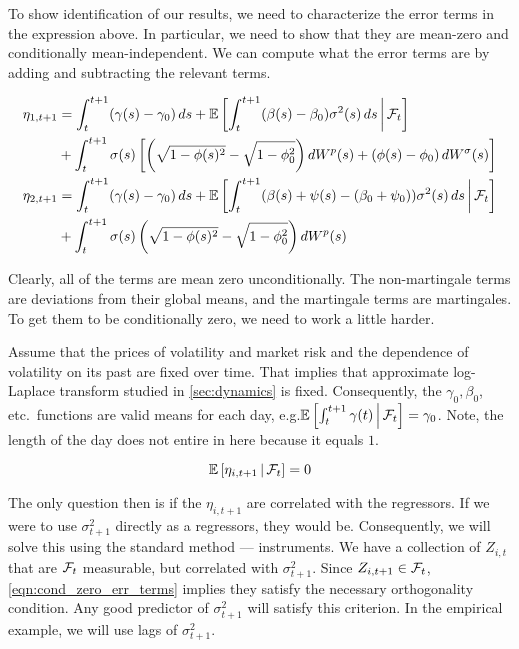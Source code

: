 \documentclass[11pt, letterpaper, twoside, final]{article}
\begin{document}
To show identification of our results, we need to characterize the error terms in the expression above.
In particular, we need to show that they are mean-zero and conditionally mean-independent.
We can compute what the error terms are by adding and subtracting the relevant terms.

\begin{alignat}{1}
    \eta_{1,t+1} 
    &= \int_t^{t+1}(\gamma(s) - \gamma_0) \dif s + \E\left[\int_t^{t+1} (\beta(s) - \beta_0) \sigma^2(s) \dif s
        \mvert \F_t\right] \\
    &+ \int_t^{t+1} \sigma(s) \left[\left(\sqrt{1 - \phi(s)^2} - \sqrt{1 - \phi_0^2}\right) \dif W^{p}(s) +
        \left(\phi(s) - \phi_0\right) \dif W^{\sigma}(s)\right] \nonumber \\
%
    \eta_{2,t+1} 
    &= \int_t^{t+1}(\gamma(s) - \gamma_0) \dif s + \E\left[\int_t^{t+1} (\beta(s) + \psi(s) - (\beta_0 + \psi_0))
       \sigma^2(s) \dif s \mvert \F_t\right] \\
    &+ \int_t^{t+1} \sigma(s) \left(\sqrt{1 - \phi(s)^2} - \sqrt{1 - \phi_0^2}\right) \dif W^{p}(s) \nonumber 
\end{alignat}

Clearly, all of the terms are mean zero unconditionally. 
The non-martingale terms are deviations from their global means, and the martingale terms are martingales.
To get them to be conditionally zero, we need to work a little harder.

Assume that the prices of volatility and market risk and the dependence of volatility on its past are fixed over
time.
That implies that approximate log-Laplace transform studied in \cref{sec:dynamics} is fixed.
Consequently, the $\gamma_0, \beta_0$, etc.\ functions are valid means for each day, e.g.\@ $\operatorname{\mathbb{E}}\left[\int_t^{t+1}
\gamma(t) \,\middle\vert\, \mathcal{F}_t \right] = \gamma_0$. 
Note, the length of the day does not entire in here because it equals $1$.

\begin{equation}
    \label{eqn:cond_zero_err_terms}
    \operatorname{\mathbb{E}}\left[\eta_{i,t+1} \,\middle\vert\, \mathcal{F}_{t}\right] = 0
\end{equation}

The only question then is if the $\eta_{i,t+1}$ are correlated with the regressors. 
If we were to use $\sigma^2_{t+1}$ directly as a regressors, they would be.
Consequently, we will solve this using the standard method --- instruments.
We have a collection of $Z_{i,t}$ that are $\mathcal{F}_t$ measurable, but correlated with $\sigma^2_{t+1}$.
Since $Z_{i,t+1} \in \mathcal{F}_t$, \cref{eqn:cond_zero_err_terms} implies they satisfy the necessary orthogonality
condition. 
Any good predictor of $\sigma^2_{t+1}$ will satisfy this criterion.
In the empirical example, we will use lags of $\sigma^2_{t+1}$.
\end{document}

